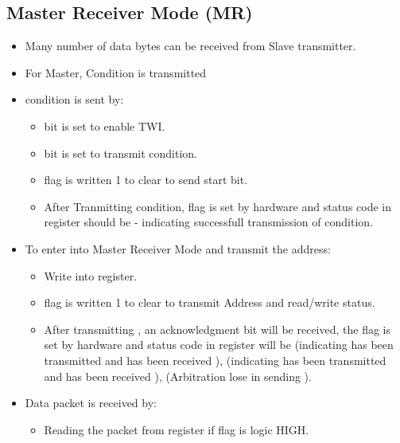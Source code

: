 \documentclass{article}
\begin{document}
\subsection{Master Receiver Mode (MR)}
\begin{itemize}
    \item Many number of data bytes can be received from Slave transmitter.
    \item For Master,  Condition is transmitted
    \item {} condition is sent by:
    \begin{itemize}
        \item {} bit is set to enable TWI.
        \item {} bit is set to transmit  condition.
        \item {} flag is written 1 to clear to send start bit.
        \item After Tranmitting  condition,  flag is set by hardware and status code in  register should be  - indicating successfull transmission of  condition.
    \end{itemize}
    \item  To enter into Master Receiver Mode and transmit the address:
    \begin{itemize}
        \item Write  into  register.
        \item {} flag is written 1 to clear to transmit Address and read/write status.
        \item After transmitting , an acknowledgment bit will be received, the  flag is set by hardware and status code in  register will be  (indicating  has been transmitted and  has been received ),  (indicating  has been transmitted and  has been received ),  (Arbitration lose in sending ).
    \end{itemize}
    \item Data packet is received by:
    \begin{itemize}
        \item Reading the  packet from  register if  flag is logic HIGH.

\end{itemize}
\end{itemize}
\end{document}
